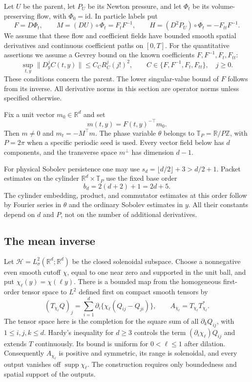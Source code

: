 \documentclass[11pt]{article}
\newcommand{\R}{\mathbb R}
\theoremstyle{definition}
\begin{document}
Let $U$ be the parent, let $P_U$ be its Newton pressure, and let $\Phi_t$ be
its volume-preserving flow, with $\Phi_0=\mathrm{id}$. In particle labels put
\begin{equation}\label{eq:packet-frame}
 F=D\Phi_t,\qquad M=(DU)\circ\Phi_t=F_tF^{-1},\qquad
 H=(D^2P_U)\circ\Phi_t=-F_{tt}F^{-1}.
\end{equation}
We assume that these flow and coefficient fields have bounded smooth
spatial derivatives and continuous coefficient paths on $[0,T]$.
For the quantitative assertions we assume a Gevrey bound on the known
coefficients $F,F^{-1},F_t,F_{tt}$:
\begin{equation}\label{eq:packet-known-jets}
 \sup_{t,y}\|D_y^j C(t,y)\|\le C_C R_C^j(j!)^2,
 \qquad C\in\{F,F^{-1},F_t,F_{tt}\},\quad j\ge0.
\end{equation}
These conditions concern the parent. The lower singular-value bound of
$F$ follows from its inverse.
All derivative norms in this section are operator norms unless specified
otherwise.

Fix a unit vector $m_0\in\R^d$ and set
\[
 m(t,y)=F(t,y)^{-\top}m_0.
\]
Then $m\ne0$ and $m_t=-M^{\top}m$. The phase variable $\theta$ belongs
to $\mathbb T_P=\R/P\mathbb Z$, with $P=2\pi$ when a specific periodic seed
is used. Every vector field below has $d$ components, and the transverse
space $m^\perp$ has dimension $d-1$.

For physical Sobolev persistence one may use
$s_d=\lfloor d/2\rfloor+3>d/2+1$. Packet
estimates on the cylinder $\R^d\times\mathbb T_P$ use the fixed base order
\begin{equation}\label{eq:packet-base-index}
 b_d=2(d+2)+1=2d+5.
\end{equation}
The cylinder embedding, product, and commutator estimates at this order
follow by Fourier series in $\theta$ and the ordinary Sobolev estimates in
$y$. All their constants depend on $d$ and $P$, not on the number of
additional derivatives.

\subsection{The mean inverse}
Let $\mathcal H=L^2_\sigma(\R^d;\R^d)$ be the closed solenoidal subspace.
Choose a nonnegative even smooth cutoff $\chi$, equal to one near zero and
supported in the unit ball, and put $\chi_\ell(y)=\chi(\ell y)$.
There is a bounded map from the homogeneous first-order tensor space to
$L^2$ defined first on compact smooth tensors by
\[
 (T_{\chi_\ell}Q)_j
   =\sum_{i=1}^d\partial_i\{\chi_\ell(Q_{ij}-Q_{ji})\},
 \qquad A_{\chi_\ell}=T_{\chi_\ell}T_{\chi_\ell}^{*}.
\]
The tensor space here is the completion for the square sum of all
$\partial_kQ_{ij}$, with $1\le i,j,k\le d$. Hardy's inequality for
$d\ge3$ controls the term $(\partial_i\chi_\ell)Q_{ij}$ and extends $T$
continuously. Its bound is uniform for $0<\ell\le1$ after dilation.
Consequently $A_{\chi_\ell}$ is positive and symmetric, its range is
solenoidal, and every output vanishes off $\operatorname{supp}\chi_\ell$.
The construction requires only boundedness and spatial support of the
outputs.
\end{document}
